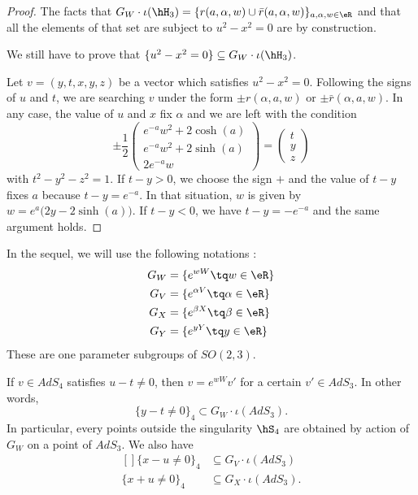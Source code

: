 \begin{proof}
The facts that $G_W\cdot\iota(\hH_3)=\{ r(a,\alpha,w)\cup\bar r(a,\alpha,w) \}_{a,\alpha,w\in\eR}$ and that all the elements of that set are subject to $u^2-x^2=0$ are by construction.

We still have to prove that $\{ u^2-x^2=0\}\subseteq G_W\cdot\iota(\hH_3)$.

Let $v=(y,t,x,y,z)$ be a vector which satisfies $u^2-x^2=0$. Following the signs of $u$ and $t$, we are searching $v$ under the form $\pm r(\alpha,a,w)$ or $\pm \bar r(\alpha,a,w)$. In any case, the value of $u$ and $x$ fix $\alpha$ and we are left with the condition
\begin{equation}
\pm\frac{ 1 }{2}
	\begin{pmatrix}
	e^{-a}w^2+2\cosh(a)	\\ 
	e^{-a}w^2+2\sinh(a)	\\ 
	2 e^{-a}w	
\end{pmatrix}
=
\begin{pmatrix}
	t	\\ 
	y	\\ 
	z	
\end{pmatrix}
\end{equation}
with $t^2-y^2-z^2=1$.  If $t-y>0$, we choose the sign $+$ and the value of $t-y$ fixes $a$ because $t-y= e^{-a}$. In that situation, $w$ is given by $w= e^{a}\big(2y-2\sinh(a)\big)$. If $t-y<0$, we have $t-y=- e^{-a}$ and the same argument holds.

\end{proof}

In the sequel, we will use the following notations :
\begin{equation}
	\begin{aligned}[]
		G_W&=\{  e^{wW}\tq w\in\eR \}\\
		G_V&=\{  e^{\alpha V}\tq \alpha\in\eR \}\\
		G_X&=\{  e^{\beta X}\tq \beta\in\eR \}\\
		G_Y&=\{  e^{y Y}\tq y\in\eR \}
	\end{aligned}
\end{equation}
These are one parameter subgroups of $SO(2,3)$.

\begin{proposition}		\label{PropInclusionsTroisQuatreWVXY}
If $v\in AdS_4$ satisfies $u-t\neq 0$, then $v= e^{wW}v'$ for a certain $v'\in AdS_3$. In other words,
\begin{equation}
	\{ y-t\neq 0 \}_4\subset G_W\cdot\iota(AdS_3).
\end{equation}
In particular, every points outside the singularity $\hS_4$ are obtained by action of $G_W$ on a point of $AdS_3$. We also have
\begin{equation}
	\begin{aligned}[]
		\{ x-u\neq 0 \}_4&\subseteq G_V\cdot\iota(AdS_3)\\
		\{ x+u\neq 0 \}_4&\subseteq G_X\cdot\iota(AdS_3).
	\end{aligned}
\end{equation}
\end{proposition}

